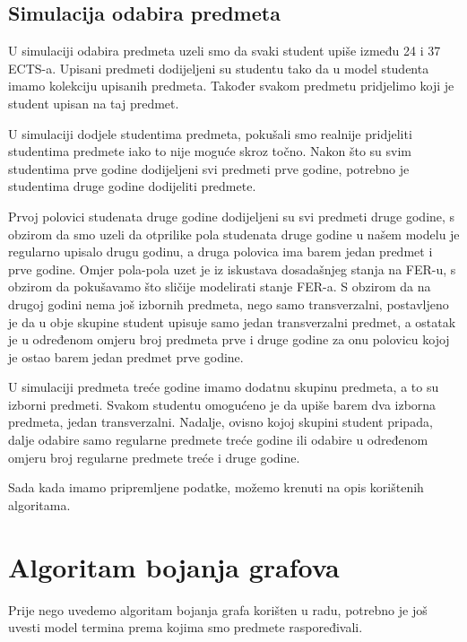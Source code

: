 \documentclass[times, utf8, zavrsni, numeric]{fer}
\begin{document}
\subsection*{Simulacija odabira predmeta}
U simulaciji odabira predmeta uzeli smo da svaki student upiše između 24 i 37 ECTS-a. Upisani predmeti dodijeljeni su studentu tako da u model studenta imamo kolekciju upisanih predmeta. Također svakom predmetu pridjelimo koji je student upisan na taj predmet.\par
U simulaciji dodjele studentima predmeta, pokušali smo realnije pridjeliti studentima predmete iako to nije moguće skroz točno.
Nakon što su svim studentima prve godine dodijeljeni svi predmeti prve godine, potrebno je studentima druge godine dodijeliti predmete.\par
Prvoj polovici studenata druge godine dodijeljeni su svi predmeti druge godine, s obzirom da smo uzeli da otprilike pola studenata druge godine u našem modelu je regularno upisalo drugu godinu, a druga polovica ima barem jedan predmet i prve godine. Omjer pola-pola uzet je iz iskustava dosadašnjeg stanja na FER-u, s obzirom da pokušavamo što sličije modelirati stanje FER-a. S obzirom da na drugoj godini nema još izbornih predmeta, nego samo transverzalni, postavljeno je da u obje skupine student upisuje samo jedan transverzalni predmet, a ostatak je u određenom omjeru broj predmeta prve i druge godine za onu polovicu kojoj je ostao barem jedan predmet prve godine.\par
U simulaciji predmeta treće godine imamo dodatnu skupinu predmeta, a to su izborni predmeti. Svakom studentu omogućeno je da upiše barem dva izborna predmeta, jedan transverzalni. Nadalje, ovisno kojoj skupini student pripada, dalje odabire samo regularne predmete treće godine ili odabire u određenom omjeru broj regularne predmete treće i druge godine.\par
Sada kada imamo pripremljene podatke, možemo krenuti na opis korištenih algoritama.

\newpage
\section{Algoritam bojanja grafova}
\label{sec:algoritam-bojanja}
Prije nego uvedemo algoritam bojanja grafa korišten u radu, potrebno je još uvesti model termina prema kojima smo predmete raspoređivali.
\end{document}
